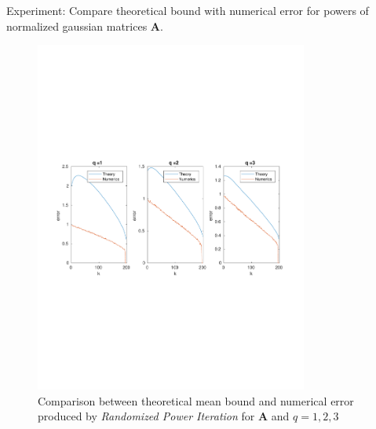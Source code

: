 \documentclass{beamer}
\newcommand{\mtx}[1]{\bm{#1}}
\begin{document}
\begin{frame}{Experiment: Compare theoretical bound with numerical error
for powers of normalized gaussian matrices $\mtx{A}$.}
\begin{figure}[H] \label{fig:exp1-2}
\begin{center}
\includegraphics[width=0.8\textwidth, trim=0cm 8cm 0cm 9cm, clip=true]{../report/figures/1-5.pdf}
\end{center}
\caption{Comparison between theoretical mean bound
and numerical error produced by \textit{Randomized Power Iteration}
for $\mtx{A}$ and $q=1,2,3$}
\end{figure}
\end{frame}
\end{document}
